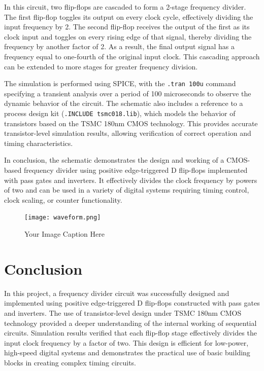 In this circuit, two flip-flops are cascaded to form a 2-stage frequency divider. The first flip-flop toggles its output on every clock cycle, effectively dividing the input frequency by 2. The second flip-flop receives the output of the first as its clock input and toggles on every rising edge of that signal, thereby dividing the frequency by another factor of 2. As a result, the final output signal has a frequency equal to one-fourth of the original input clock. This cascading approach can be extended to more stages for greater frequency division.

The simulation is performed using SPICE, with the \texttt{.tran 100u} command specifying a transient analysis over a period of 100 microseconds to observe the dynamic behavior of the circuit. The schematic also includes a reference to a process design kit (\texttt{.INCLUDE tsmc018.lib}), which models the behavior of transistors based on the TSMC 180nm CMOS technology. This provides accurate transistor-level simulation results, allowing verification of correct operation and timing characteristics.

In conclusion, the schematic demonstrates the design and working of a CMOS-based frequency divider using positive edge-triggered D flip-flops implemented with pass gates and inverters. It effectively divides the clock frequency by powers of two and can be used in a variety of digital systems requiring timing control, clock scaling, or counter functionality.

\begin{figure}[H] %
    \centering
    \texttt{[image: waveform.png]}
    \caption{Your Image Caption Here}
    \label{fig:Output Waveform}
\end{figure}
\section*{Conclusion}
In this project, a frequency divider circuit was successfully designed and implemented using positive edge-triggered D flip-flops constructed with pass gates and inverters. The use of transistor-level design under TSMC 180nm CMOS technology provided a deeper understanding of the internal working of sequential circuits. Simulation results verified that each flip-flop stage effectively divides the input clock frequency by a factor of two. This design is efficient for low-power, high-speed digital systems and demonstrates the practical use of basic building blocks in creating complex timing circuits.

